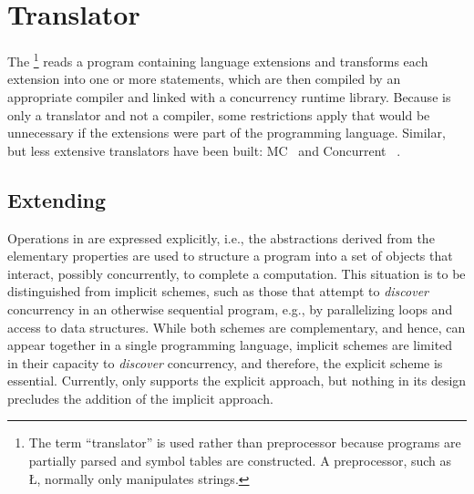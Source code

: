 \documentclass[openright,twoside]{report}
\begin{document}
\chapter{\texorpdfstring{\uC Translator}{uC++ Translator}}

The \uC {}\footnote{
The term ``translator'' is used rather than preprocessor because \uC programs are partially parsed and symbol tables are constructed.
A preprocessor, such as \LGinlinetrue\LGbegin\lgrinde\L{}\endlgrinde\LGend{}, normally only manipulates strings.
}
reads a program containing language extensions and transforms each extension into one or more \CC statements, which are then compiled by an appropriate \CC compiler and linked with a concurrency runtime library.
Because \uC is only a translator and not a compiler, some restrictions apply that would be unnecessary if the extensions were part of the \CC programming language.
Similar, but less extensive translators have been built: MC~\cite{Rizk87} and Concurrent \CC~\cite{ConcurrentC++}.


\section{\texorpdfstring{Extending \CC}{Extending C++}}

Operations in \uC are expressed explicitly, i.e., the abstractions derived from the elementary properties are used to structure a program into a set of objects that interact, possibly concurrently, to complete a computation.
This situation is to be distinguished from implicit schemes, such as those that attempt to \emph{discover} concurrency in an otherwise sequential program, e.g., by parallelizing loops and access to data structures.
While both schemes are complementary, and hence, can appear together in a single programming language, implicit schemes are limited in their capacity to \emph{discover} concurrency, and therefore, the explicit scheme is essential.
Currently, \uC only supports the explicit approach, but nothing in its design precludes the addition of the implicit approach.
\end{document}
